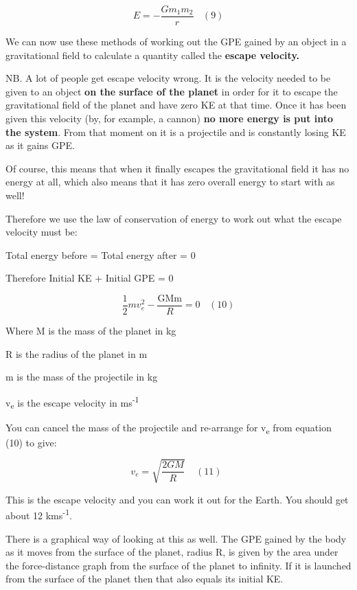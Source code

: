 \documentclass[main.tex]{subfiles}
\begin{document}
\[E = - \frac{Gm_{1}m_{2}}{r}\ \ \ \ (9)\]


We can now use these methods of working out the GPE gained by an object
in a gravitational field to calculate a quantity called the
\textbf{escape velocity.}

NB. A lot of people get escape velocity wrong. It is the velocity needed
to be given to an object \textbf{on the surface of the planet} in order
for it to escape the gravitational field of the planet and have zero KE
at that time. Once it has been given this velocity (by, for example, a
cannon) \textbf{no more energy is put into the system}. From that moment
on it is a projectile and is constantly losing KE as it gains GPE.

Of course, this means that when it finally escapes the gravitational
field it has no energy at all, which also means that it has zero overall
energy to start with as well!

Therefore we use the law of conservation of energy to work out what the
escape velocity must be:

Total energy before = Total energy after = 0

Therefore Initial KE + Initial GPE = 0

\[\frac{1}{2}mv_{e}^{2} - \frac{\text{GMm}}{R} = 0\ \ \ \ \left( 10 \right)\]

Where M is the mass of the planet in kg

R is the radius of the planet in m

m is the mass of the projectile in kg

v\textsubscript{e} is the escape velocity in ms\textsuperscript{-1}

You can cancel the mass of the projectile and re-arrange for
v\textsubscript{e} from equation (10) to give:

\[v_{e} = \sqrt{\frac{2GM}{R}}\ \ \ \ \ (11)\ \ \]

This is the escape velocity and you can work it out for the Earth. You
should get about 12 kms\textsuperscript{-1}.

There is a graphical way of looking at this as well. The GPE gained by
the body as it moves from the surface of the planet, radius R, is given
by the area under the force-distance graph from the surface of the
planet to infinity. If it is launched from the surface of the planet
then that also equals its initial KE.
\end{document}
